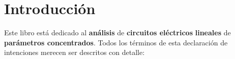 \chapter{Introducción}
\label{cha:intro}


Este libro está dedicado al \textbf{análisis} de \textbf{circuitos eléctricos} \textbf{lineales} de \textbf{parámetros concentrados}. Todos los términos de esta declaración de intenciones merecen ser descritos con detalle:

